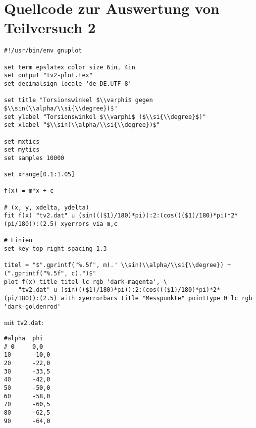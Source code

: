 \section{\gnuplot{} Quellcode zur Auswertung von Teilversuch 2}
    \label{appdx:gnuplottv2}
    {  
        \renewcommand{\fcolorbox}[4][]{#4}
        \begin{verbatim}
#!/usr/bin/env gnuplot

set term epslatex color size 6in, 4in
set output "tv2-plot.tex"
set decimalsign locale 'de_DE.UTF-8'

set title "Torsionswinkel $\\varphi$ gegen $\\sin(\\alpha/\\si{\\degree})$"
set ylabel "Torsionswinkel $\\varphi$ ($\\si{\\degree}$)"
set xlabel "$\\sin(\\alpha/\\si{\\degree})$"

set mxtics
set mytics
set samples 10000

set xrange[0.1:1.05]

f(x) = m*x + c

# (x, y, xdelta, ydelta)
fit f(x) "tv2.dat" u (sin((($1)/180)*pi)):2:(cos((($1)/180)*pi)*2*(pi/180)):(2.5) xyerrors via m,c

# Linien
set key top right spacing 1.3

titel = "$".gprintf("%.5f", m)." \\sin(\\alpha/\\si{\\degree}) + (".gprintf("%.5f", c).")$"
plot f(x) title titel lc rgb 'dark-magenta', \
    "tv2.dat" u (sin((($1)/180)*pi)):2:(cos((($1)/180)*pi)*2*(pi/180)):(2.5) with xyerrorbars title "Messpunkte" pointtype 0 lc rgb 'dark-goldenrod'
        \end{verbatim}
    }
    mit \texttt{tv2.dat}:
    \begin{multicols}{2}
        \begin{verbatim}
#alpha  phi
# 0     0,0
10      -10,0
20      -22,0
30      -33,5
40      -42,0
50      -50,0
60      -58,0
70      -60,5
80      -62,5
90      -64,0
        \end{verbatim}
    \end{multicols}
